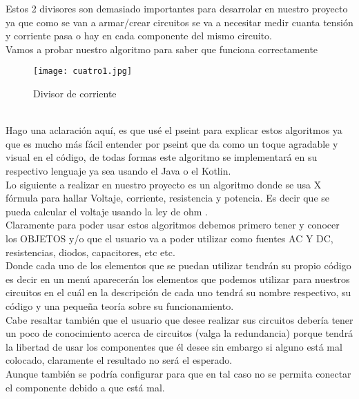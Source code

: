 \documentclass[journal]{IEEEtran}
\begin{document}
Estos 2 divisores son demasiado importantes para desarrolar en nuestro proyecto ya que como se van a armar/crear circuitos se va a necesitar medir cuanta tensión y corriente pasa o hay en cada componente del mismo circuito.\\
Vamos a probar nuestro algoritmo para saber que funciona correctamente\\
\begin{figure}[h!]
\texttt{[image: cuatro1.jpg]}%
\caption{Divisor de corriente}
\label{Figura: c}
\end{figure}\\

Hago una aclaración aquí, es que usé el pseint para explicar estos algoritmos ya que es mucho más fácil entender por pseint que da como un toque agradable y visual en el código, de todas formas este algoritmo se implementará en su respectivo lenguaje ya sea usando el Java o el Kotlin.\\

Lo siguiente a realizar en nuestro proyecto es un algoritmo donde se usa X fórmula para hallar Voltaje, corriente, resistencia y potencia. 
Es decir que se pueda calcular el voltaje usando la ley de ohm .\\
Claramente para poder usar estos algoritmos debemos primero tener y conocer los OBJETOS y/o que el usuario va a poder utilizar como fuentes AC Y DC, resistencias, diodos, capacitores, etc etc.\\
Donde cada uno de los elementos que se puedan utilizar tendrán su propio código es decir en un menú aparecerán los elementos que podemos utilizar para nuestros circuitos en el cuál en la descripción de cada uno tendrá su nombre respectivo, su código y una pequeña teoría sobre su funcionamiento.\\
Cabe resaltar también que el usuario que desee realizar sus circuitos debería tener un poco de conocimiento acerca de circuitos (valga la redundancia) porque tendrá la libertad de usar los componentes que él desee sin embargo si alguno está mal colocado, claramente el resultado no será el esperado. \\
Aunque también se podría configurar para que en tal caso no se permita conectar el componente debido a que está mal.\\
\end{document}
